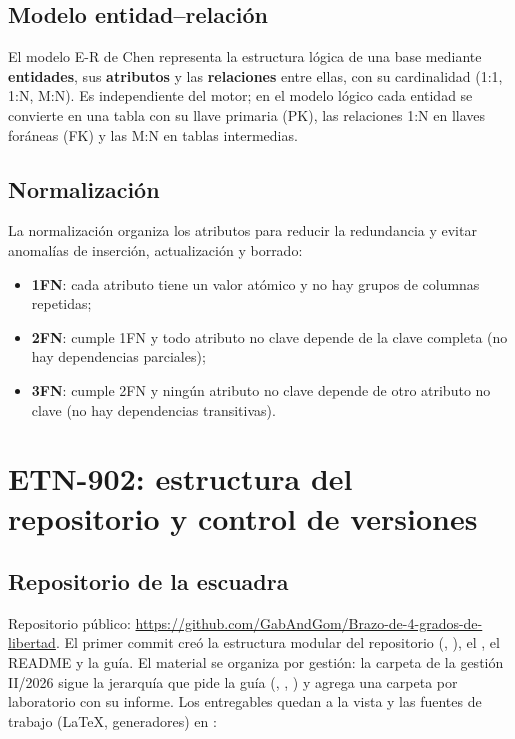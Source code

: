 \documentclass[a4paper,11pt]{article}
\begin{document}
\subsection{Modelo entidad--relación}
El modelo E-R de Chen representa la estructura lógica de una base mediante \textbf{entidades}, sus \textbf{atributos} y las \textbf{relaciones} entre ellas, con su cardinalidad (1:1, 1:N, M:N). Es independiente del motor; en el modelo lógico cada entidad se convierte en una tabla con su llave primaria (PK), las relaciones 1:N en llaves foráneas (FK) y las M:N en tablas intermedias.

\subsection{Normalización}
La normalización organiza los atributos para reducir la redundancia y evitar anomalías de inserción, actualización y borrado:
\begin{itemize}
\item \textbf{1FN}: cada atributo tiene un valor atómico y no hay grupos de columnas repetidas;
\item \textbf{2FN}: cumple 1FN y todo atributo no clave depende de la clave completa (no hay dependencias parciales);
\item \textbf{3FN}: cumple 2FN y ningún atributo no clave depende de otro atributo no clave (no hay dependencias transitivas).
\end{itemize}

\section{ETN-902: estructura del repositorio y control de versiones}
\subsection{Repositorio de la escuadra}
Repositorio público: \url{https://github.com/GabAndGom/Brazo-de-4-grados-de-libertad}. El primer commit creó la estructura modular del repositorio (, ), el , el README y la guía. El material se organiza por gestión: la carpeta de la gestión II/2026 sigue la jerarquía que pide la guía (, , ) y agrega una carpeta por laboratorio con su informe. Los entregables quedan a la vista y las fuentes de trabajo (LaTeX, generadores) en :
\end{document}
